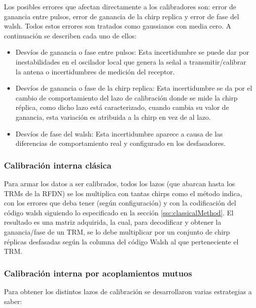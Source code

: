 Los posibles errores que afectan directamente a los calibradores son: error de ganancia entre pulsos, error de ganancia de la
chirp replica y error de fase del walsh. Todos estos errores son tratados como gaussianos con media cero. A continuación se
describen cada uno de ellos:
\begin{itemize}
	\item Desvíos de ganancia o fase entre pulsos: Esta incertidumbre se puede dar por inestabilidades en el oscilador local que
		genera la señal a transmitir/calibrar la antena o incertidumbres de medición del receptor.
	\item Desvíos de ganancia o fase de la chirp replica: Esta incertidumbre se da por el cambio de comportamiento del lazo de
		calibración donde se mide la chirp réplica, como dicho lazo está caracterizado, cuando cambia su valor de ganancia, esta
		variación es atribuida a la chirp en vez de al lazo.
	\item Desvíos de fase del walsh: Esta incertidumbre aparece a causa de las diferencias de comportamiento real y configurado en
		los desfasadores. 
\end{itemize}


\subsubsection{Calibración interna clásica}

Para armar los datos a ser calibrados, todos los lazos (que abarcan hasta los TRMs de la RFDN) se los multiplica con 
tantas chirps como el método indica, con los errores que deba tener (según configuración) y con la codificación del código 
walsh siguiendo lo especificado en la sección \ref{ssc:classicalMethod}. El resultado es una matriz adquirida, la cual, para
decodificar y obtener la ganancia/fase de un TRM, se lo debe multiplicar por un conjunto de chirp réplicas desfasadas según la 
columna del código Walsh al que perteneciente el TRM. 


\subsubsection{Calibración interna por acoplamientos mutuos}

Para obtener los distintos lazos de calibración se desarrollaron varias estrategias a saber: 

